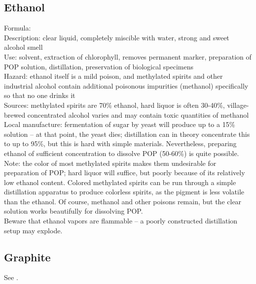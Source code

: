 \subsection*{Ethanol}
Formula: \\
Description: clear liquid, 
completely miscible with water, 
strong and sweet alcohol smell\\
Use: solvent, 
extraction of chlorophyll, 
removes permanent marker, 
preparation of POP solution, 
distillation, 
preservation of biological specimens\\
Hazard: ethanol itself is a mild poison, 
and methylated spirits and other industrial alcohol contain 
additional poisonous impurities (methanol) 
specifically so that no one drinks it\\
Sources: methylated spirits are 70\% ethanol, 
hard liquor is often 30-40\%, 
village-brewed concentrated alcohol varies 
and may contain toxic quantities of methanol\\
Local manufacture: fermentation of sugar by yeast will produce 
up to a 15\% solution -- at that point, 
the yeast dies; 
distillation can in theory concentrate this to up to 95\%, 
but this is hard with simple materials. 
Nevertheless, 
preparing ethanol of sufficient concentration to dissolve POP (50-60\%) 
is quite possible.\\
Note: the color of most methylated spirits makes them undesirable 
for preparation of POP; 
hard liquor will suffice, 
but poorly because of its relatively low ethanol content. 
Colored methylated spirits can be run 
through a simple distillation apparatus to produce colorless spirits, 
as the pigment is less volatile than the ethanol. 
Of course, 
methanol and other poisons remain, 
but the clear solution works beautifully for dissolving POP.\\ 
Beware that ethanol vapors are flammable -- 
a poorly constructed distillation setup may explode.
\subsection*{Graphite}
See .
